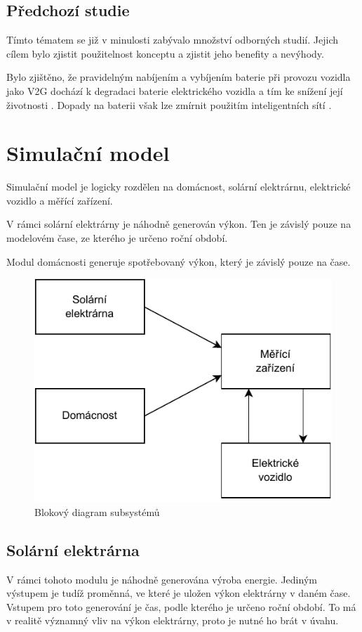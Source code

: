 \documentclass[12pt,a4paper]{article}
\begin{document}
\subsection{Předchozí studie}
Tímto tématem se již v minulosti zabývalo množství odborných studií. Jejich cílem bylo zjistit použitelnost konceptu a zjistit jeho benefity a nevýhody. 

Bylo zjištěno, že pravidelným nabíjením a vybíjením baterie při provozu vozidla jako V2G dochází k degradaci baterie elektrického vozidla a tím ke snížení její životnosti 
\cite{Shirazi-2018}.
Dopady na baterii však lze zmírnit použitím inteligentních sítí 
\cite{University-of-Warwick-2017}.

\section{Simulační model}
Simulační model je logicky rozdělen na domácnost, solární elektrárnu, elektrické vozidlo a měřící zařízení.

V rámci solární elektrárny je náhodně generován výkon.
Ten je závislý pouze na modelovém čase, ze kterého je určeno roční období.

Modul domácnosti generuje spotřebovaný výkon, který je závislý pouze na čase.

\begin{figure}[H]
\begin{center}
\includegraphics[width=0.6\linewidth]{img/diagram.pdf}
\caption{Blokový diagram subsystémů}
\end{center}
\label{fig:solar_month}
\end{figure}

\subsection{Solární elektrárna}
V rámci tohoto modulu je náhodně generována výroba energie.
Jediným výstupem je tudíž proměnná, ve které je uložen výkon elektrárny v daném čase.
Vstupem pro toto generování je čas, podle kterého je určeno roční období.
To má v realitě významný vliv na výkon elektrárny, proto je nutné ho brát v úvahu.
\end{document}
